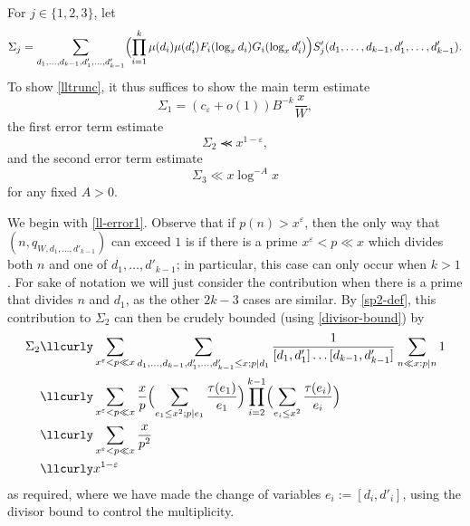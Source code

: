 \documentclass{bmcart}
\theoremstyle{plain}
\theoremstyle{definition}
\newcommand\eps{\varepsilon}
\renewcommand{\lessapprox}{\llcurly}
\begin{document}
For $j\in\{1,2,3\}$, let
\begin{equation}
 \Sigma_j= \sum_{d_1,\dots,d_{k-1},d'_1,\dots,d'_{k-1}}\Bigl(\prod_{i=1}^k \mu(d_{i}) \mu(d'_{i}) F_{i}(\log_x d_{i}) G_{i}(\log_x d'_{i})\Bigr) S'_j(d_1,\dots,d_{k-1},d'_1,\dots,d'_{k-1}).
\label{eq:SigmaDef}
\end{equation}
To show \eqref{lltrunc}, it thus suffices to show the main term estimate
\begin{equation}\label{ll-main}
 \Sigma_1= (c_\eps + o(1)) B^{-k} \frac{x}{W},
\end{equation}
the first error term estimate
\begin{equation}\label{ll-error1}
\Sigma_2 \lessapprox x^{1-\eps},
\end{equation}
and the second error term estimate
\begin{equation}\label{ll-error2}
\Sigma_3 \ll x \log^{-A} x
\end{equation}
for any fixed $A>0$.

We begin with \eqref{ll-error1}.  Observe that if $p(n) > x^\eps$, then the only way that $(n,q_{W,d_1,\dots,d'_{k-1}})$ can exceed $1$ is if there is a prime $x^\eps < p \ll x$ which divides both $n$ and one of $d_1,\dots,d'_{k-1}$; in particular, this case can only occur when $k > 1$.  For sake of notation we will just consider the contribution when there is a prime that divides $n$ and $d_1$, as the other $2k-3$ cases are similar.  By \eqref{sp2-def}, this contribution to $\Sigma_2$ can then be crudely bounded (using \eqref{divisor-bound}) by
\begin{align*}
 \Sigma_2&\lessapprox \sum_{x^\eps < p \ll x} \sum_{d_1,\dots,d_{k-1},d'_1,\dots,d'_{k-1} \leq x; p|d_1} \frac{1}{[d_1,d'_1] \dots [d_{k-1},d'_{k-1}]} \sum_{n \ll x: p|n} 1 \\
&\lessapprox \sum_{x^\eps < p \ll x} \frac{x}{p} \Bigl(\sum_{e_1 \leq x^2; p|e_1} \frac{\tau(e_1)}{e_1}\Bigr) \prod_{i=2}^{k-1} \Bigl(\sum_{e_i \leq x^2} \frac{\tau(e_i)}{e_i}\Bigr) \\
&\lessapprox \sum_{x^\eps < p \ll x} \frac{x}{p^2} \\
&\lessapprox x^{1-\eps}
\end{align*}
as required, where we have made the change of variables $e_i := [d_i,d'_i]$, using the divisor bound to control the multiplicity.  
\end{document}
